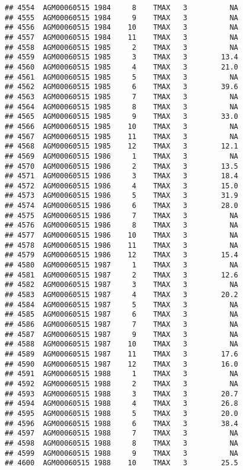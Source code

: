 \documentclass{article}\usepackage[]{graphicx}\usepackage[]{color}
\makeatletter
\newenvironment{kframe}{%
 \def\at@end@of@kframe{}%
 \ifinner\ifhmode%
  \def\at@end@of@kframe{\end{minipage}}%
  \begin{minipage}{\columnwidth}%
 \fi\fi%
 \def\FrameCommand##1{\hskip\@totalleftmargin \hskip-\fboxsep
 \colorbox{shadecolor}{##1}\hskip-\fboxsep
     \hskip-\linewidth \hskip-\@totalleftmargin \hskip\columnwidth}%
 \MakeFramed {\advance\hsize-\width
   \@totalleftmargin\z@ \linewidth\hsize
   \@setminipage}}%
 {\par\unskip\endMakeFramed%
 \at@end@of@kframe}
\newenvironment{knitrout}{}{} %
\makeatother
\begin{document}
\begin{knitrout}
\begin{kframe}
\begin{verbatim}
## 4554  AGM00060515 1984     8    TMAX   3          NA
## 4555  AGM00060515 1984     9    TMAX   3          NA
## 4556  AGM00060515 1984    10    TMAX   3          NA
## 4557  AGM00060515 1984    11    TMAX   3          NA
## 4558  AGM00060515 1985     2    TMAX   3          NA
## 4559  AGM00060515 1985     3    TMAX   3        13.4
## 4560  AGM00060515 1985     4    TMAX   3        21.0
## 4561  AGM00060515 1985     5    TMAX   3          NA
## 4562  AGM00060515 1985     6    TMAX   3        39.6
## 4563  AGM00060515 1985     7    TMAX   3          NA
## 4564  AGM00060515 1985     8    TMAX   3          NA
## 4565  AGM00060515 1985     9    TMAX   3        33.0
## 4566  AGM00060515 1985    10    TMAX   3          NA
## 4567  AGM00060515 1985    11    TMAX   3          NA
## 4568  AGM00060515 1985    12    TMAX   3        12.1
## 4569  AGM00060515 1986     1    TMAX   3          NA
## 4570  AGM00060515 1986     2    TMAX   3        13.5
## 4571  AGM00060515 1986     3    TMAX   3        18.4
## 4572  AGM00060515 1986     4    TMAX   3        15.0
## 4573  AGM00060515 1986     5    TMAX   3        31.9
## 4574  AGM00060515 1986     6    TMAX   3        28.0
## 4575  AGM00060515 1986     7    TMAX   3          NA
## 4576  AGM00060515 1986     8    TMAX   3          NA
## 4577  AGM00060515 1986    10    TMAX   3          NA
## 4578  AGM00060515 1986    11    TMAX   3          NA
## 4579  AGM00060515 1986    12    TMAX   3        15.4
## 4580  AGM00060515 1987     1    TMAX   3          NA
## 4581  AGM00060515 1987     2    TMAX   3        12.6
## 4582  AGM00060515 1987     3    TMAX   3          NA
## 4583  AGM00060515 1987     4    TMAX   3        20.2
## 4584  AGM00060515 1987     5    TMAX   3          NA
## 4585  AGM00060515 1987     6    TMAX   3          NA
## 4586  AGM00060515 1987     7    TMAX   3          NA
## 4587  AGM00060515 1987     9    TMAX   3          NA
## 4588  AGM00060515 1987    10    TMAX   3          NA
## 4589  AGM00060515 1987    11    TMAX   3        17.6
## 4590  AGM00060515 1987    12    TMAX   3        16.0
## 4591  AGM00060515 1988     1    TMAX   3          NA
## 4592  AGM00060515 1988     2    TMAX   3          NA
## 4593  AGM00060515 1988     3    TMAX   3        20.7
## 4594  AGM00060515 1988     4    TMAX   3        26.8
## 4595  AGM00060515 1988     5    TMAX   3        20.0
## 4596  AGM00060515 1988     6    TMAX   3        38.4
## 4597  AGM00060515 1988     7    TMAX   3          NA
## 4598  AGM00060515 1988     8    TMAX   3          NA
## 4599  AGM00060515 1988     9    TMAX   3          NA
## 4600  AGM00060515 1988    10    TMAX   3        25.5

\end{verbatim}
\end{kframe}
\end{knitrout}
\end{document}
